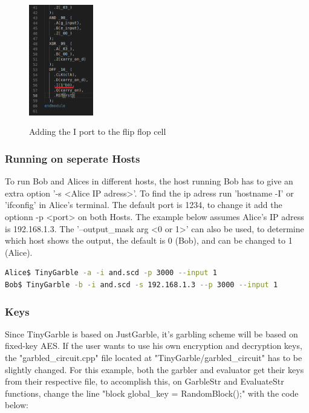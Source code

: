 \begin{refsection}
\begin{figure}[H]
	\centering
	\includegraphics[width=0.25\textwidth, height=5.5cm]{./sdf/tiny_garble/figures/i_port_cell.png}
    \caption{Adding the I port to the flip flop cell}\label{fig:key_file}
\end{figure}

\subsubsection{Running on seperate Hosts}

To run Bob and Alices in different hosts, the host running Bob has to give an extra option '-s <Alice IP adress>'. To find the ip adress run 'hostname -I' or 'ifconfig' in Alice's terminal. The default port is 1234, to change it add the optionn -p <port> on both Hosts. The example below assumes Alice's IP adress is 192.168.1.3. The '--output\_mask arg <0 or 1>' can also be used, to determine which host shows the output, the default is 0 (Bob), and can be changed to 1 (Alice).
\begin{lstlisting}[caption={Installation of Yosys-abc for Ubuntu 15.04>}, language=bash, captionpos=b]
Alice$ TinyGarble -a -i and.scd -p 3000 --input 1
Bob$ TinyGarble -b -i and.scd -s 192.168.1.3 --p 3000 --input 1
\end{lstlisting}

\subsubsection{Keys}

Since TinyGarble is based on JustGarble, it's garbling scheme will be based on fixed-key AES. If the user wants to use his own encryption and decryption keys, the "garbled\_circuit.cpp" file located at "TinyGarble/garbled\_circuit" has to be slightly changed. For this example, both the garbler and evaluator get their keys from their respective file, to accomplish this, on GarbleStr and EvaluateStr functions, change the line "block global\_key =  RandomBlock();" with the code below:


\end{refsection}
